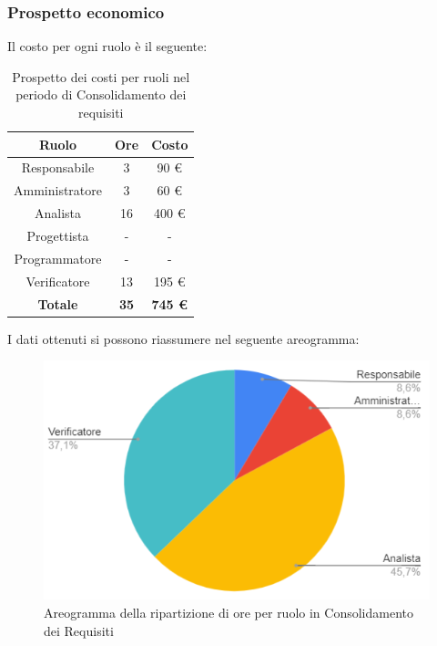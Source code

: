 \subsubsection{Prospetto economico}
Il costo per ogni ruolo è il seguente:
\begin{table}[H]
		\begin{center}
			\setlength{\aboverulesep}{0pt}
			\setlength{\belowrulesep}{0pt}
			\setlength{\extrarowheight}{.75ex}
			\begin{tabular}{ c c c }
				\rowcolor{AzzurroGruppo!30} 
				\textbf{Ruolo} & \textbf{Ore} & \textbf{Costo}  \\
				\toprule
				Responsabile   & 3 & 90 \euro \\
				Amministratore & 3 & 60 \euro \\
				Analista       & 16 & 400 \euro \\
				Progettista    & - & - \\
				Programmatore  & - & - \\
				Verificatore   & 13 & 195 \euro \\
				\textbf{Totale} & \textbf{35} & \textbf{745 \euro} \\
				\bottomrule
			\end{tabular}
			\caption{ Prospetto dei costi per ruoli nel periodo di Consolidamento dei requisiti}
		\end{center}
	\end{table}
I dati ottenuti si possono riassumere nel seguente areogramma:
\begin{figure}[H]
    \centering
    \includegraphics[scale = 0.5]{components/img/consolidamento_torta.png}
    \caption{ Areogramma della ripartizione di ore per ruolo in Consolidamento dei Requisiti}
    \label{fig:Areogramma ripartizione ore , fase di Consolidamento dei requisiti}
\end{figure}
